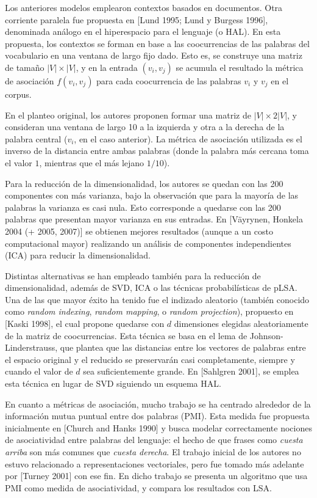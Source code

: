 Los anteriores modelos emplearon contextos basados en documentos. Otra corriente paralela fue
propuesta en [Lund 1995; Lund y Burgess 1996], denominada análogo en el hiperespacio para el
lenguaje (o HAL). En esta propuesta, los contextos se forman en base a las coocurrencias de las
palabras del vocabulario en una ventana de largo fijo dado. Esto es, se construye una matriz de
tamaño $|V| \times |V|$, y en la entrada $(v_i, v_j)$ se acumula el resultado la métrica de
asociación $f(v_i, v_j)$ para cada coocurrencia de las palabras $v_i$ y $v_j$ en el corpus.

En el planteo original, los autores proponen formar una matriz de $|V| \times 2|V|$, y consideran
una ventana de largo 10 a la izquierda y otra a la derecha de la palabra central ($v_i$, en el caso
anterior). La métrica de asociación utilizada es el inverso de la distancia entre ambas palabras
(donde la palabra más cercana toma el valor $1$, mientras que el más lejano $1/10$).

Para la reducción de la dimensionalidad, los autores se quedan con las 200 componentes con más
varianza, bajo la observación que para la mayoría de las palabras la varianza es casi nula. Esto
corresponde a quedarse con las 200 palabras que presentan mayor varianza en sus entradas. En
[Väyrynen, Honkela 2004 (+ 2005, 2007)] se obtienen mejores resultados (aunque a un costo
computacional mayor) realizando un análisis de componentes independientes (ICA) para reducir la
dimensionalidad.


Distintas alternativas se han empleado también para la reducción de dimensionalidad, además de SVD,
ICA o las técnicas probabilísticas de pLSA\@. Una de las que mayor éxito ha tenido fue el indizado
aleatorio (también conocido como \textit{random indexing}, \textit{random mapping}, o \textit{random
projection}), propuesto en [Kaski 1998], el cual propone quedarse con $d$ dimensiones elegidas
aleatoriamente de la matriz de coocurrencias. Esta técnica se basa en el lema de
Johnson-Linderstrauss, que plantea que las distancias entre los vectores de palabras entre el
espacio original y el reducido se preservarán casi completamente, siempre y cuando el valor de $d$
sea suficientemente grande. En [Sahlgren 2001], se emplea esta técnica en lugar de SVD siguiendo un
esquema HAL\@.


En cuanto a métricas de asociación, mucho trabajo se ha centrado alrededor de la información mutua
puntual entre dos palabras (PMI). Esta medida fue propuesta inicialmente en [Church and Hanks 1990]
y busca modelar correctamente nociones de asociatividad entre palabras del lenguaje: el hecho de que
frases como \textit{cuesta arriba} son más comunes que \textit{cuesta derecha}. El trabajo inicial
de los autores no estuvo relacionado a representaciones vectoriales, pero fue tomado más adelante
por [Turney 2001] con ese fin. En dicho trabajo se presenta un algoritmo que usa PMI como medida de
asociatividad, y compara los resultados con LSA\@.

